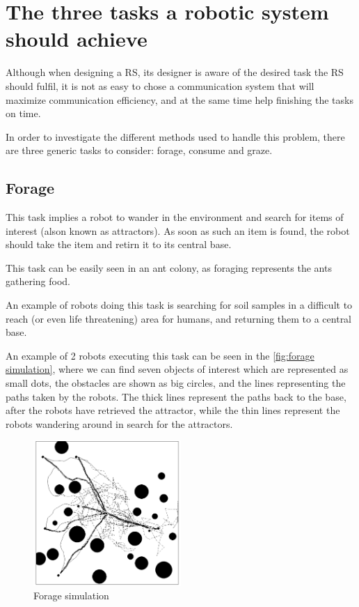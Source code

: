 \documentclass[12pt]{report}
\begin{document}
\chapter{The three tasks a robotic system should achieve}

Although when designing a RS, its designer is aware of the desired task the RS should fulfil, 
it is not as easy to chose a communication system that will maximize communication efficiency, and at the same time help finishing the tasks on time.

In order to investigate the different methods used to handle this problem, there are three generic tasks to consider: forage, consume and graze.









\section{Forage}

This task implies a robot to wander in the environment and search for items of interest (alson known as attractors). As soon as such an item is found, the robot should take the item and retirn it to its central base. 

This task can be easily seen in an ant colony, as foraging represents the ants gathering food.

An example of robots doing this task is searching for soil samples in a difficult to reach (or even life threatening) area for humans, and returning them to a  central base.

An example of 2 robots executing this task can be seen in the \autoref{fig:forage simulation}, where we can find seven objects of interest which are represented as small dots, the obstacles are shown as big circles, and the lines representing the paths taken by the robots. The thick lines represent the paths back to the base, after the robots have retrieved the attractor, while the thin lines represent the robots wandering around in search for the attractors.

\begin{figure}[h]
\centering
\includegraphics[width=0.5\textwidth]{"1 forage simulation"}
\caption{Forage simulation}
\label{fig:forage simulation}
\end{figure}
\end{document}
